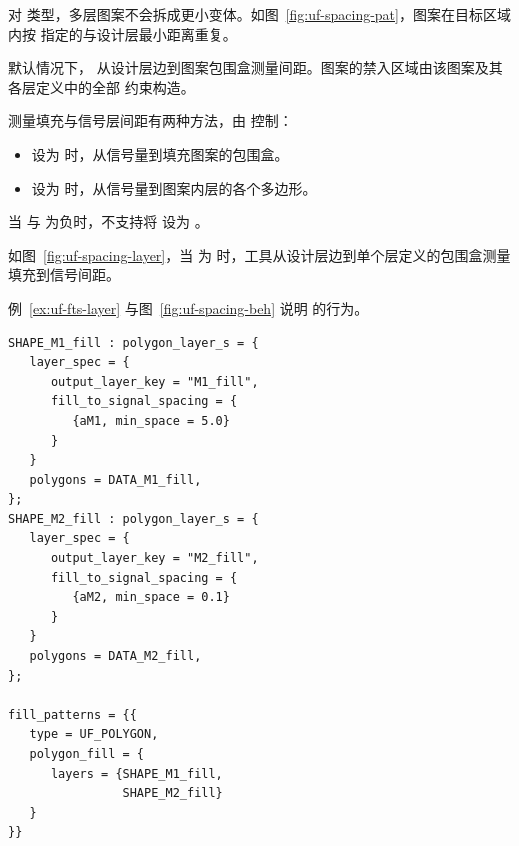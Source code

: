 对  类型，多层图案不会拆成更小变体。如图~\ref{fig:uf-spacing-pat}，图案在目标区域内按  指定的与设计层最小距离重复。

默认情况下， 从设计层边到图案包围盒测量间距。图案的禁入区域由该图案及其各层定义中的全部  约束构造。

测量填充与信号层间距有两种方法，由  控制：
\begin{itemize}
  \item 设为  时，从信号量到填充图案的包围盒。
  \item 设为  时，从信号量到图案内层的各个多边形。
\end{itemize}

\begin{noteBox}
当  与  为负时，不支持将  设为 。
\end{noteBox}


如图~\ref{fig:uf-spacing-layer}，当  为  时，工具从设计层边到单个层定义的包围盒测量填充到信号间距。


例~\ref{ex:uf-fts-layer} 与图~\ref{fig:uf-spacing-beh} 说明  的行为。

\begin{lstlisting}[style=pxl,caption={填充层定义中的 fill\_to\_signal\_spacing},label={ex:uf-fts-layer}]
SHAPE_M1_fill : polygon_layer_s = {
   layer_spec = {
      output_layer_key = "M1_fill",
      fill_to_signal_spacing = {
         {aM1, min_space = 5.0}
      }
   }
   polygons = DATA_M1_fill,
};
SHAPE_M2_fill : polygon_layer_s = {
   layer_spec = {
      output_layer_key = "M2_fill",
      fill_to_signal_spacing = {
         {aM2, min_space = 0.1}
      }
   }
   polygons = DATA_M2_fill,
};

fill_patterns = {{
   type = UF_POLYGON,
   polygon_fill = {
      layers = {SHAPE_M1_fill,
                SHAPE_M2_fill}
   }
}}
\end{lstlisting}



